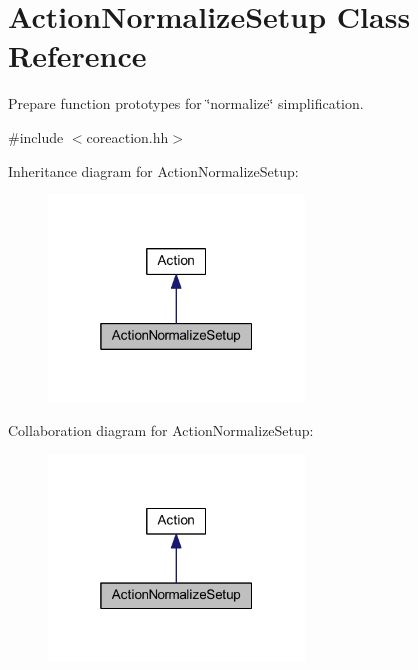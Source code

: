 \hypertarget{class_action_normalize_setup}{}\section{Action\+Normalize\+Setup Class Reference}
\label{class_action_normalize_setup}


Prepare function prototypes for \char`\"{}normalize\char`\"{} simplification.  




{\ttfamily \#include $<$coreaction.\+hh$>$}



Inheritance diagram for Action\+Normalize\+Setup\+:
\nopagebreak
\begin{figure}[H]
\begin{center}
\leavevmode
\includegraphics[width=193pt]{class_action_normalize_setup__inherit__graph}
\end{center}
\end{figure}


Collaboration diagram for Action\+Normalize\+Setup\+:
\nopagebreak
\begin{figure}[H]
\begin{center}
\leavevmode
\includegraphics[width=193pt]{class_action_normalize_setup__coll__graph}
\end{center}
\end{figure}
